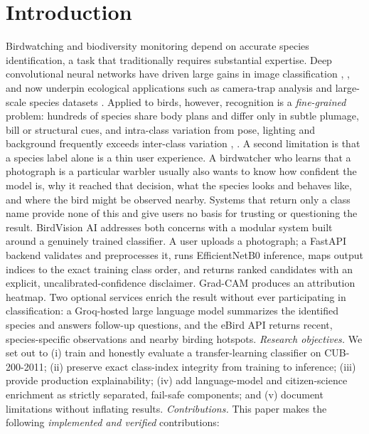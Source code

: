 \documentclass[conference]{IEEEtran}
\begin{document}
\section{Introduction}
Birdwatching and biodiversity monitoring depend on accurate species identification, a task that traditionally requires substantial expertise. Deep convolutional neural networks have driven large gains in image classification \cite{ref1}, \cite{ref3}, \cite{ref4} and now underpin ecological applications such as camera-trap analysis \cite{ref18} and large-scale species datasets \cite{ref7}. Applied to birds, however, recognition is a \textit{fine-grained} problem: hundreds of species share body plans and differ only in subtle plumage, bill or structural cues, and intra-class variation from pose, lighting and background frequently exceeds inter-class variation \cite{ref6}, \cite{ref8}.
A second limitation is that a species label alone is a thin user experience. A birdwatcher who learns that a photograph is a particular warbler usually also wants to know how confident the model is, why it reached that decision, what the species looks and behaves like, and where the bird might be observed nearby. Systems that return only a class name provide none of this and give users no basis for trusting or questioning the result.
BirdVision AI addresses both concerns with a modular system built around a genuinely trained classifier. A user uploads a photograph; a FastAPI backend validates and preprocesses it, runs EfficientNetB0 inference, maps output indices to the exact training class order, and returns ranked candidates with an explicit, uncalibrated-confidence disclaimer. Grad-CAM \cite{ref11} produces an attribution heatmap. Two optional services enrich the result without ever participating in classification: a Groq-hosted large language model summarizes the identified species and answers follow-up questions, and the eBird API \cite{ref16} returns recent, species-specific observations and nearby birding hotspots.
\textit{Research objectives.} We set out to (i) train and honestly evaluate a transfer-learning classifier on CUB-200-2011; (ii) preserve exact class-index integrity from training to inference; (iii) provide production explainability; (iv) add language-model and citizen-science enrichment as strictly separated, fail-safe components; and (v) document limitations without inflating results.
\textit{Contributions.} This paper makes the following \textit{implemented and verified} contributions:
\end{document}
